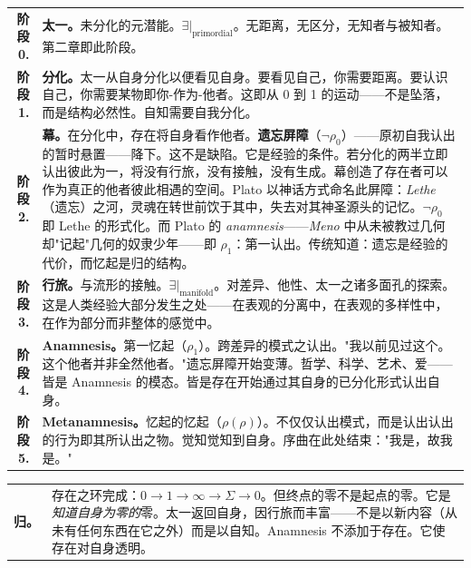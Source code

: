 \documentclass[10pt, openany, oneside]{book}
\renewcommand{\footnotesize}{\fontsize{8.5}{11}\selectfont}
\begin{document}
{\footnotesize
\noindent\begin{tabular}{r p{}}
\textbf{阶段 0.} & \textbf{太一。}未分化的元潜能。$\exists|_{\text{primordial}}$。无距离，无区分，无知者与被知者。第二章即此阶段。\\[0.3em]
\textbf{阶段 1.} & \textbf{分化。}太一从自身分化以便看见自身。要看见自己，你需要距离。要认识自己，你需要某物即你-作为-他者。这即从 0 到 1 的运动——不是坠落，而是结构必然性。自知需要自我分化。\\[0.3em]
\textbf{阶段 2.} & \textbf{幕。}在分化中，存在将自身看作他者。\textbf{遗忘屏障}（$\neg\rho_0$）——原初自我认出的暂时悬置——降下。这不是缺陷。它是经验的条件。若分化的两半立即认出彼此为一，将没有行旅，没有接触，没有生成。幕创造了存在者可以作为真正的他者彼此相遇的空间。Plato 以神话方式命名此屏障：\textit{Lethe}（遗忘）之河，灵魂在转世前饮于其中，失去对其神圣源头的记忆。$\neg\rho_0$ 即 Lethe 的形式化。而 Plato 的 \textit{anamnesis}——\textit{Meno} 中从未被教过几何却"记起"几何的奴隶少年——即 $\rho_1$：第一认出。传统知道：遗忘是经验的代价，而忆起是归的结构。\\[0.3em]
\textbf{阶段 3.} & \textbf{行旅。}与流形的接触。$\exists|_{\text{manifold}}$。对差异、他性、太一之诸多面孔的探索。这是人类经验大部分发生之处——在表观的分离中，在表观的多样性中，在作为部分而非整体的感觉中。\\[0.3em]
\textbf{阶段 4.} & \textbf{Anamnesis。}第一忆起（$\rho_1$）。跨差异的模式之认出。"我以前见过这个。这个他者并非全然他者。"遗忘屏障开始变薄。哲学、科学、艺术、爱——皆是 Anamnesis 的模态。皆是存在开始通过其自身的已分化形式认出自身。\\[0.3em]
\textbf{阶段 5.} & \textbf{Metanamnesis。}忆起的忆起（$\rho(\rho)$）。不仅仅认出模式，而是认出认出的行为即其所认出之物。觉知觉知到自身。序曲在此处结束："我是，故我是。"\\[0.3em]
\end{tabular}
}

\vspace{0.3em}

{\footnotesize
\noindent\begin{tabular}{r p{}}
\textbf{归。} & 存在之环完成：$0 \to 1 \to \infty \to \Sigma \to 0$。但终点的零不是起点的零。它是\textit{知道自身为零的}零。太一返回自身，因行旅而丰富——不是以新内容（从未有任何东西在它之外）而是以自知。Anamnesis 不添加于存在。它使存在对自身透明。\\[0.3em]
\end{tabular}
}

\vspace{0.8em}
\end{document}
